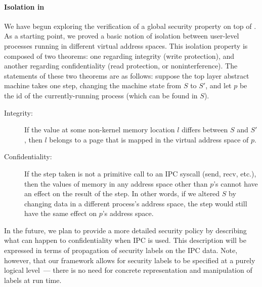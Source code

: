 \paragraph{Isolation in \mCTOSbase{}}
\label{security}
We have begun exploring the verification of a global security 
property on top of \mCTOSbase{}. As a starting point, we proved a basic notion of 
isolation between user-level processes running in different virtual 
address spaces. This isolation property is composed of two theorems:
one regarding integrity (write protection), and another regarding
confidentiality (read protection, or noninterference). 
The statements of these two theorems are as follows:
suppose the top layer abstract machine takes
one step, changing the machine state from $S$ to
$S'$, and let $p$ be the id of the currently-running process 
(which can be found in $S$).
\begin{description}
  \item[Integrity:]
If the value at some non-kernel memory location $l$ differs between
$S$ and $S'$, then $l$ belongs to a page that is mapped in the 
virtual address space of $p$.
\item[Confidentiality:]
\label{confidential}
If the step taken
is not a primitive call to an IPC syscall (send, recv, etc.), then the values
of memory in any address space other than $p$'s cannot have an effect on the
result of the step. In other words, if we altered $S$ 
by changing data in a different process's address space, the step would still 
have the same effect on $p$'s address space.
\end{description}

In the future, we plan to provide a more detailed
security policy by describing what can happen to confidentiality when IPC is used.
This description will be expressed in terms of propagation of security labels
on the IPC data. Note, however, that our framework allows for security labels
to be specified at a purely logical level~--- there is no need for
concrete representation and manipulation of labels at run time.

